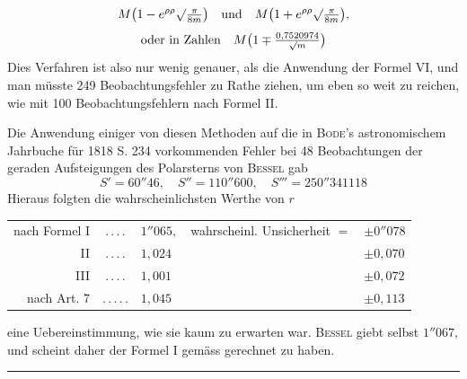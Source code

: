 \[
\begin{gathered}
M\bigl(1-e^{\rho\rho}\surd\tfrac\pi{8m}\bigr)\quad\text{und}\quad M\bigl(1+e^{\rho\rho}\surd\tfrac\pi{8m}\bigr),\\[4pt]
\text{oder in Zahlen}\quad M\bigl(1\mp\tfrac{0{,}7520974}{\surd m}\bigr)
\end{gathered}
\]
Dies Verfahren ist also nur wenig genauer, als die Anwendung der Formel VI, und man müsste 249 Beobachtungsfehler zu Rathe ziehen, um eben so weit zu reichen, wie mit 100 Beobachtungsfehlern nach Formel II.

Die Anwendung einiger von diesen Methoden auf die in \textsc{Bode}'s astronomischem Jahrbuche für 1818 S. 234 vorkommenden Fehler bei 48 Beobachtungen der geraden Aufsteigungen des Polarsterns von \textsc{Bessel} gab
\[
S'=60''46,\quad S''=110''600,\quad S'''=250''341118
\]
Hieraus folgten die wahrscheinlichsten Werthe von \(r\)
\begin{center}
\begin{tabular}{r@{\;}c@{\;}l@{\quad}l@{\;}l}
nach Formel I&.\,.\,.\,.&\(1''065,\)&wahrscheinl. Unsicherheit \(=\)&\(\pm0''078\)\\
II&.\,.\,.\,.&\(1{,}024\)&&\(\pm0{,}070\)\\
III&.\,.\,.\,.&\(1{,}001\)&&\(\pm0{,}072\)\\
nach Art. 7&.\,.\,.\,.\,.&\(1{,}045\)&&\(\pm0{,}113\)
\end{tabular}
\end{center}
eine Uebereinstimmung, wie sie kaum zu erwarten war. \textsc{Bessel} giebt selbst \(1''067\), und scheint daher der Formel I gemäss gerechnet zu haben.
\begin{center}\rule{.24\linewidth}{.3pt}\end{center}

